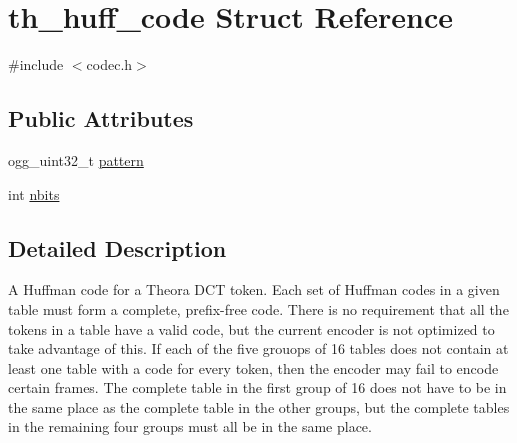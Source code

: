 \hypertarget{structth__huff__code}{\section{th\+\_\+huff\+\_\+code Struct Reference}
\label{structth__huff__code}
}


{\ttfamily \#include $<$codec.\+h$>$}

\subsection*{Public Attributes}
\begin{DoxyCompactItemize}
\item 
ogg\+\_\+uint32\+\_\+t \hyperlink{structth__huff__code_a6dd29e3aa5a0c5a2dd5ce1f45b1162b4}{pattern}
\item 
int \hyperlink{structth__huff__code_aaf97b8f2f90042f7bc136a7b2bc35e35}{nbits}
\end{DoxyCompactItemize}


\subsection{Detailed Description}
A Huffman code for a Theora D\+C\+T token. Each set of Huffman codes in a given table must form a complete, prefix-\/free code. There is no requirement that all the tokens in a table have a valid code, but the current encoder is not optimized to take advantage of this. If each of the five grouops of 16 tables does not contain at least one table with a code for every token, then the encoder may fail to encode certain frames. The complete table in the first group of 16 does not have to be in the same place as the complete table in the other groups, but the complete tables in the remaining four groups must all be in the same place. 


